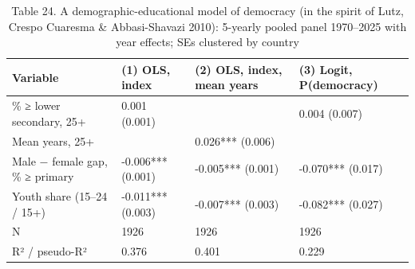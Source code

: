 \begin{table}
\caption{Table 24. A demographic-educational model of democracy (in the spirit of Lutz, Crespo Cuaresma & Abbasi-Shavazi 2010): 5-yearly pooled panel 1970–2025 with year effects; SEs clustered by country}
\label{tab:T24_expectation_model}
\begin{tabular}{llll}
\toprule
Variable & (1) OLS, index & (2) OLS, index, mean years & (3) Logit, P(democracy) \\
\midrule
\% ≥ lower secondary, 25+ & 0.001 (0.001) &  & 0.004 (0.007) \\
Mean years, 25+ &  & 0.026*** (0.006) &  \\
Male − female gap, \% ≥ primary & -0.006*** (0.001) & -0.005*** (0.001) & -0.070*** (0.017) \\
Youth share (15–24 / 15+) & -0.011*** (0.003) & -0.007*** (0.003) & -0.082*** (0.027) \\
N & 1926 & 1926 & 1926 \\
R² / pseudo-R² & 0.376 & 0.401 & 0.229 \\
\bottomrule
\end{tabular}
\end{table}

